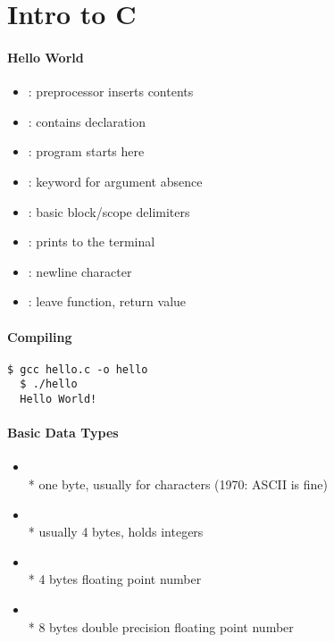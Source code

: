 \section{Intro to C}

\paragraph{Hello World}

\begin{itemize}
  \item {}: preprocessor inserts  contents
  \item {}: contains  declaration
  \item {}: program starts here
  \item {}: keyword for argument absence
  \item \code{\{  \}}: basic block/scope delimiters
  \item {}: prints to the terminal
  \item \code{\\n}: newline character
  \item {}: leave function, return value
\end{itemize}

\paragraph{Compiling}
\begin{lstlisting}[style=custombash]
  $ gcc hello.c -o hello
  $ ./hello
  Hello World!
\end{lstlisting}

\paragraph{Basic Data Types}
\begin{itemize}
  \item {} \\*
    one byte, usually for characters (1970: ASCII is fine)
  \item {} \\*
    usually 4 bytes, holds integers
  \item {} \\*
    4 bytes floating point number
  \item {} \\*
    8 bytes double precision floating point number
\end{itemize}

